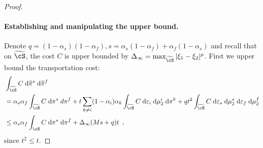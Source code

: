 \begin{proof}
    \paragraph{Establishing and manipulating the upper bound.}
    Denote $q = (1 - \alpha_s)(1 - \alpha_f), s = \alpha_s (1-\alpha_f) + \alpha_f (1 - \alpha_s)$
    and recall that on $\widetilde{\cS}$, the cost $C$ is upper bounded by
    $\Delta_{\infty} = \max_{\widetilde{\cS}}|\xi_1 - \xi_2|^p$.
    First we upper bound the transportation cost:
    \begin{equation*}
      \label{seq:cost-split}
      \begin{split}
        &\int_{\widetilde{\cS}} C \; \mathrm d\widetilde{\pi}^s \; \mathrm d\widetilde{\pi}^f \\
        &= \alpha_s\alpha_f\int_{\widetilde{\cS}} C \; \mathrm d\pi^s \; d\pi^f +
        t \sum_{k \neq i} (1-\alpha_i) \alpha_k \int_{\widetilde{\cS}} C \;
        \mathrm d \varepsilon_i \; \mathrm d\mu^i_2  \; \mathrm d\pi^k +
        q t^2 \int_{\widetilde{\cS}} C \; \mathrm d \varepsilon_s \; \mathrm d\mu_2^s \;
        \mathrm d\varepsilon_f \; \mathrm d\mu^f_2 \\
        &\leq \alpha_s\alpha_f \int_{\cS} C \; \mathrm d\pi^s \;\mathrm d\pi^f +
        \Delta_{\infty}(Ms + q)t\enspace,
      \end{split}
    \end{equation*}
   since $t^2 \leq t$.


\end{proof}
